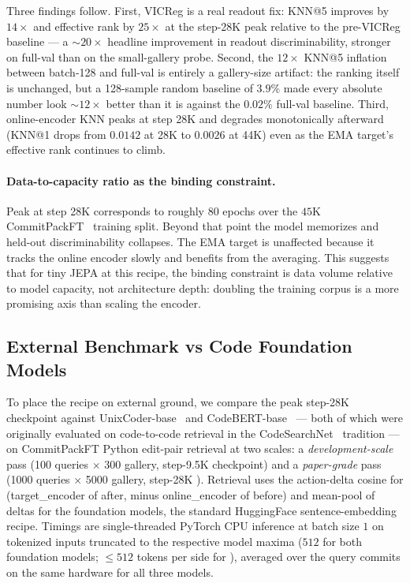 Three findings follow.  First, VICReg is a real readout fix: KNN@5
improves by $14\times$ and effective rank by $25\times$ at the step-28K
peak relative to the pre-VICReg baseline --- a $\sim\!20\times$
headline improvement in readout discriminability, stronger on full-val
than on the small-gallery probe.  Second, the $12\times$ KNN@5 inflation between
batch-128 and full-val is entirely a gallery-size artifact: the
ranking itself is unchanged, but a 128-sample random baseline of
$3.9\%$ made every absolute number look $\sim\!12\times$ better than
it is against the $0.02\%$ full-val baseline.  Third, online-encoder
KNN peaks at step 28K and degrades monotonically afterward (KNN@1
drops from $0.0142$ at 28K to $0.0026$ at 44K) even as the EMA
target's effective rank continues to climb.

\paragraph{Data-to-capacity ratio as the binding constraint.}
Peak at step 28K corresponds to roughly $80$ epochs over the $45$K
CommitPackFT~\citep{muennighoff2024octopack} training split.  Beyond
that point the model memorizes
and held-out discriminability collapses.  The EMA target is unaffected
because it tracks the online encoder slowly and benefits from the
averaging.  This suggests that for tiny JEPA at this recipe, the
binding constraint is data volume relative to model capacity, not
architecture depth: doubling the training corpus is a more promising
axis than scaling the encoder.

\subsection{External Benchmark vs Code Foundation Models}
\label{subsec:foundation}

To place the recipe on external ground, we compare the peak step-28K
\CodeWM{} checkpoint against UnixCoder-base~\citep{guo2022unixcoder}
and CodeBERT-base~\citep{feng2020codebert} --- both of which were
originally evaluated on code-to-code retrieval in the
CodeSearchNet~\citep{husain2019codesearchnet} tradition --- on
CommitPackFT Python edit-pair retrieval at two scales: a
\emph{development-scale} pass (100 queries $\times$ 300 gallery,
step-9.5K \CodeWM{} checkpoint) and a \emph{paper-grade} pass (1000
queries $\times$ 5000 gallery, step-28K \CodeWM{}).  Retrieval uses the
action-delta cosine for \CodeWM{} (target\_encoder of after, minus
online\_encoder of before) and mean-pool of 
deltas for the foundation models, the standard HuggingFace
sentence-embedding recipe.  Timings are single-threaded PyTorch CPU
inference at batch size $1$ on tokenized inputs truncated to the
respective model maxima ($512$ for both foundation models; $\leq 512$
tokens per side for \CodeWM{}), averaged over the query commits on
the same hardware for all three models.

